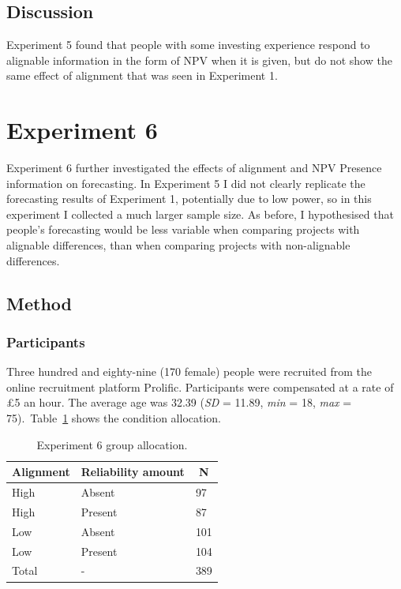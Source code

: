 \documentclass[a4paper, nobind, dvipsnames]{templates/ociamthesis}
\theoremstyle{definition}
\theoremstyle{definition}
\theoremstyle{definition}
\theoremstyle{definition}
\theoremstyle{remark}
\begin{document}
\subsection{Discussion}

Experiment 5 found that people with some investing experience respond to
alignable information in the form of NPV when it is given, but do not show the
same effect of alignment that was seen in Experiment 1.

\section{Experiment 6}

Experiment 6 further investigated the effects of alignment and NPV Presence
information on forecasting. In Experiment 5 I did not clearly replicate the
forecasting results of Experiment 1, potentially due to low power, so in this
experiment I collected a much larger sample size. As before, I hypothesised that
people's forecasting would be less variable when comparing projects with
alignable differences, than when comparing projects with non-alignable
differences.

\subsection{Method}

\subsubsection{Participants}

Three hundred and eighty-nine (170 female) people were recruited from the online recruitment platform Prolific. Participants were compensated at a rate of £5 an hour. The average age was 32.39 (\emph{SD} = 11.89, \emph{min} = 18, \emph{max} = 75).~Table~\ref{tab:condition-allocation-alignment-5}
shows the condition allocation.

\begin{table}[tbp]

\begin{center}
\begin{threeparttable}

\caption{\label{tab:condition-allocation-alignment-5}Experiment 6 group allocation.}

\begin{tabular}{lll}
\toprule
Alignment & \multicolumn{1}{c}{Reliability amount} & \multicolumn{1}{c}{N}\\
\midrule
High & Absent & 97\\
High & Present & 87\\
Low & Absent & 101\\
Low & Present & 104\\
Total & - & 389\\
\bottomrule
\end{tabular}

\end{threeparttable}
\end{center}

\end{table}
\end{document}
